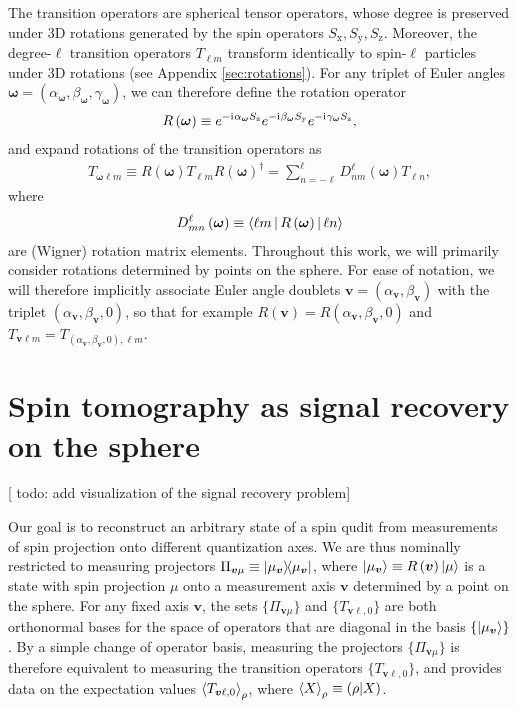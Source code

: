 \documentclass[notitlepage,twocolumn]{revtex4-2}
\newcommand{\p}[1]{\left(#1\right)} %
\newcommand{\bk}{\Braket} %
\renewcommand{\v}{\bm} %
\renewcommand{\i}{\mathrm{i}\mkern1mu} %
\renewcommand{\set}[1]{\{#1\}} %
\newcommand{\x}{\text{x}}
\newcommand{\y}{\text{y}}
\newcommand{\z}{\text{z}}
\def\obk#1{\mathinner{({#1})}}
\newcommand{\red}[1]{{\color{red} #1}}
\begin{document}
The transition operators are spherical tensor operators, whose degree is preserved under 3D rotations generated by the spin operators $S_\x,S_\y,S_\z$.
Moreover, the degree-$\ell$ transition operators $T_{\ell m}$ transform identically to spin-$\ell$ particles under 3D rotations (see Appendix \ref{sec:rotations}).
For any triplet of Euler angles $\v\omega=\p{\alpha_{\v\omega},\beta_{\v\omega},\gamma_{\v\omega}}$, we can therefore define the rotation operator
\begin{align}
  R\p{\v\omega} \equiv e^{-\i\alpha_{\v\omega}S_\z} e^{-\i\beta_{\v\omega}S_\y} e^{-\i\gamma_{\v\omega}S_\z},
\end{align}
and expand rotations of the transition operators as
\begin{align}
  T_{\v\omega\ell m} \equiv
  R\p{\v\omega} T_{\ell m} R\p{\v\omega}^\dag
  = \sum_{n=-\ell}^\ell D_{nm}^\ell\p{\v\omega} T_{\ell n},
  \label{eq:trans_rot}
\end{align}
where
\begin{align}
  D_{mn}^\ell\p{\v\omega} \equiv \bk{\ell m|R\p{\v\omega}|\ell n}
\end{align}
are (Wigner) rotation matrix elements.
Throughout this work, we will primarily consider rotations determined by points on the sphere.
For ease of notation, we will therefore implicitly associate Euler angle doublets $\v v=\p{\alpha_{\v v},\beta_{\v v}}$ with the triplet $\p{\alpha_{\v v},\beta_{\v v},0}$, so that for example $R\p{\v v} = R\p{\alpha_{\v v},\beta_{\v v},0}$ and $T_{\v v\ell m} = T_{\p{\alpha_{\v v},\beta_{\v v},0},\ell m}$.

\section{Spin tomography as signal recovery on the sphere}
\label{sec:signal_recovery}

[\red{todo: add visualization of the signal recovery problem}]

Our goal is to reconstruct an arbitrary state of a spin qudit from measurements of spin projection onto different quantization axes.
We are thus nominally restricted to measuring projectors $\Pi_{\v v\mu} \equiv \op{\mu_{\v v}}$, where $\ket{\mu_{\v v}}\equiv R\p{\v v}\ket{\mu}$ is a state with spin projection $\mu$ onto a measurement axis $\v v$ determined by a point on the sphere.
For any fixed axis $\v v$, the sets $\set{\Pi_{\v v\mu}}$ and $\set{T_{\v v\ell,0}}$ are both orthonormal bases for the space of operators that are diagonal in the basis $\set{\ket{\mu_{\v v}}}$.
By a simple change of operator basis, measuring the projectors $\set{\Pi_{\v v\mu}}$ is therefore equivalent to measuring the transition operators $\set{T_{\v v\ell,0}}$, and provides data on the expectation values $\bk{T_{\v v\ell,0}}_\rho$, where $\bk{X}_\rho\equiv\obk{\rho|X}$.
\end{document}
